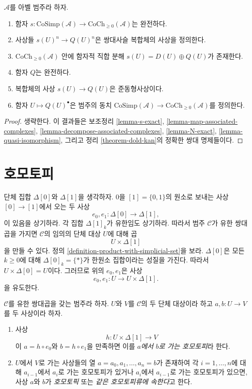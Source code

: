 \begin{lemma}
\label{lemma-dual-dold-kan}
$\mathcal{A}$를 아벨 범주라 하자.
\begin{enumerate}
\item 함자
$s : \text{CoSimp}(\mathcal{A}) \to \text{CoCh}_{\geq 0}(\mathcal{A})$는
완전하다.
\item 사상들 $s(U)^n \to Q(U)^n$은 쌍대사슬 복합체의 사상을 정의한다.
\item $\text{CoCh}_{\geq 0}(\mathcal{A})$ 안에 함자적 직합 분해
$s(U) = D(U) \oplus Q(U)$가 존재한다.
\item 함자 $Q$는 완전하다.
\item 복합체의 사상 $s(U) \to Q(U)$은 준동형사상이다.
\item 함자 $U \mapsto Q(U)^\bullet$은 범주의 동치
$\text{CoSimp}(\mathcal{A}) \to \text{CoCh}_{\geq 0}(\mathcal{A})$를
정의한다.
\end{enumerate}
\end{lemma}

\begin{proof}
생략한다. 이 결과들은 보조정리 \ref{lemma-s-exact},
\ref{lemma-map-associated-complexes},
\ref{lemma-decompose-associated-complexes}, \ref{lemma-N-exact},
\ref{lemma-quasi-isomorphism}, 그리고 정리 \ref{theorem-dold-kan}의
정확한 쌍대 명제들이다.
\end{proof}
\section{호모토피}
\label{section-homotopy}

\noindent
단체 집합 $\Delta[0]$와 $\Delta[1]$을 생각하자. $0$을
$[1] = \{0, 1\}$의 원소로 보내는 사상 $[0] \to [1]$에서 오는 두 사상
$$
e_0, e_1 : \Delta[0] \longrightarrow \Delta[1],
$$
이 있음을 상기하라. 각 집합 $\Delta[1]_k$가 유한임도 상기하라. 따라서
범주 $\mathcal{C}$가 유한 쌍대곱을 가지면 $\mathcal{C}$의 임의의 단체
대상 $U$에 대해 곱
$$
U \times \Delta[1]
$$
을 만들 수 있다. 정의 \ref{definition-product-with-simplicial-set}을 보라.
$\Delta[0]$은 모든 $k \geq 0$에 대해
$\Delta[0]_k = \{*\}$가 한원소 집합이라는 성질을 가진다. 따라서
$U \times \Delta[0] = U$이다.
그러므로 위의 $e_0, e_1$은 사상
$$
e_0, e_1 : U \to U \times \Delta[1].
$$
을 유도한다.

\begin{definition}
\label{definition-homotopy}
$\mathcal{C}$를 유한 쌍대곱을 갖는 범주라 하자. $U$와 $V$를
$\mathcal{C}$의 두 단체 대상이라 하고 $a, b : U \to V$를 두 사상이라
하자.
\begin{enumerate}
\item 사상
$$
h : U \times \Delta[1] \longrightarrow V
$$
이 $a = h \circ e_0$와 $b = h \circ e_1$을 만족하면 이를
{\it $a$에서 $b$로 가는 호모토피}라 한다.
\item $U$에서 $V$로 가는 사상들의 열
$a = a_0, a_1, \ldots, a_n = b$가 존재하여 각 $i = 1, \ldots, n$에
대해 $a_{i - 1}$에서 $a_i$로 가는 호모토피가 있거나 $a_i$에서
$a_{i - 1}$로 가는 호모토피가 있으면, 사상 $a$와 $b$가
{\it 호모토픽} 또는 {\it 같은 호모토피류에 속한다}고 한다.
\end{enumerate}
\end{definition}

